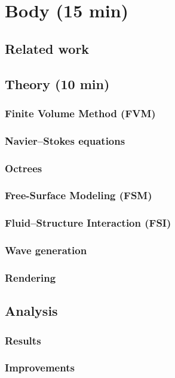 
\section{Body (15 min)}

\begin{frame}
\end{frame}

\subsection{Related work}

\subsection{Theory (10 min)}

\subsubsection{Finite Volume Method (FVM)}
\subsubsection{Navier--Stokes equations}
\subsubsection{Octrees}
\subsubsection{Free-Surface Modeling (FSM)}
\subsubsection{Fluid--Structure Interaction (FSI)}
\subsubsection{Wave generation}
\subsubsection{Rendering}

\subsection{Analysis}
\subsubsection{Results}
\subsubsection{Improvements}
